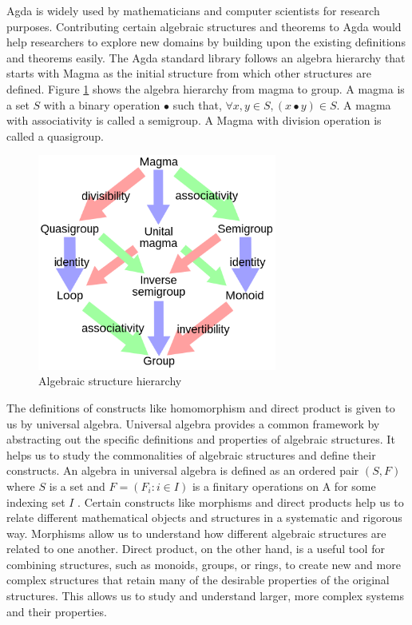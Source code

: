 Agda is widely used by mathematicians and computer scientists for research
purposes. Contributing certain algebraic structures and theorems to Agda would
help researchers to explore new domains by building upon the existing
definitions and theorems easily. The Agda standard library follows an algebra
hierarchy that starts with Magma as the initial structure from which other
structures are defined. Figure \ref{fig_magma} shows the algebra hierarchy from
magma to group. A magma is a set $S$ with a binary operation $∙$ such that,
$\forall x,y \in S, (x ∙ y) \in S$. A magma with associativity is called a
semigroup. A Magma with division operation is called a quasigroup.
\begin{figure}[ht]
	\centering
	\includegraphics[width=0.7\textwidth]{figures/Sample/Magma_to_group.jpg}
	\caption{Algebraic structure hierarchy \cite{enwiki:1107380309}}
	\label{fig_magma}
 \end{figure}
The definitions of constructs like homomorphism and direct product is given to
us by universal algebra. Universal algebra provides a common framework by
abstracting out the specific definitions and properties of algebraic structures.
It helps us to study the commonalities of algebraic structures and define their
constructs. An algebra in universal algebra is defined as an ordered pair
$(S,F)$ where $S$ is a set and $F = (F_i:i\in I)$ is a finitary operations on A
for some indexing set $I$ \cite{sannella2012foundations}. Certain constructs
like morphisms and direct products help us to relate different mathematical
objects and structures in a systematic and rigorous way. Morphisms
allow us to understand how different algebraic structures are related to one
another. Direct product, on the other hand, is a useful tool for combining
structures, such as monoids, groups, or rings, to create new and more
complex structures that retain many of the desirable properties of the original
structures. This allows us to study and understand larger, more complex systems
and their properties.

